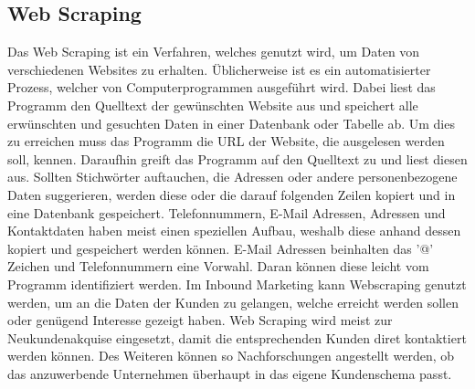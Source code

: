 \subsection{Web Scraping}
Das Web Scraping ist ein Verfahren, welches genutzt wird, um Daten von verschiedenen Websites zu erhalten. Üblicherweise ist es ein automatisierter Prozess, welcher von Computerprogrammen ausgeführt wird. Dabei liest das Programm den Quelltext der gewünschten Website aus und speichert alle erwünschten und gesuchten Daten in einer Datenbank oder Tabelle ab.
\newline
Um dies zu erreichen muss das Programm die URL der Website, die ausgelesen werden soll, kennen. Daraufhin greift das Programm auf den Quelltext zu und liest diesen aus. Sollten Stichwörter auftauchen, die Adressen oder andere personenbezogene Daten suggerieren, werden diese oder die darauf folgenden Zeilen kopiert und in eine Datenbank gespeichert. Telefonnummern, E-Mail Adressen, Adressen und Kontaktdaten haben meist einen speziellen Aufbau, weshalb diese anhand dessen kopiert und gespeichert werden können. E-Mail Adressen beinhalten das '@' Zeichen und Telefonnummern eine Vorwahl. Daran können diese leicht vom Programm identifiziert werden.
\newline
Im Inbound Marketing kann Webscraping genutzt werden, um an die Daten der Kunden zu gelangen, welche erreicht werden sollen oder genügend Interesse gezeigt haben. Web Scraping wird meist zur Neukundenakquise eingesetzt, damit die entsprechenden Kunden diret kontaktiert werden können. Des Weiteren können so Nachforschungen angestellt werden, ob das anzuwerbende Unternehmen überhaupt in das eigene Kundenschema passt. 

